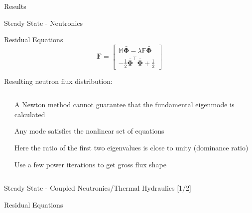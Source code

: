 \documentclass{beamer}
\begin{document}
\begin{section}{Results}
\begin{frame}{Steady State - Neutronics}
\begin{customlist}{2ex}{0pt}
  \item Residual Equations
  \[
    \mathbf{F}=\left[\begin{array}{c}
    \mathbb{M}\bar{\mathbf{\Phi}}-\lambda\mathbb{F}\bar{\mathbf{\Phi}}\\
    -\frac{1}{2}\bar{\mathbf{\Phi}}^{\top}\bar{\mathbf{\Phi}}+\frac{1}{2}
    \end{array}\right]
  \]
  \item Resulting neutron flux distribution:
\end{customlist}
  \begin{center}
  \begin{columns}
    \begin{column}{0.5\textwidth}
      \begin{animateinline}[poster = first, controls]{2}
	\scalebox{0.5}{}
	\newframe \scalebox{0.5}{}
      \end{animateinline}
    \end{column}
    \begin{column}{0.5\textwidth}
      \begin{customlist}{2ex}{0pt}
	\item A Newton method cannot guarantee that the fundamental eigenmode is calculated
	\item Any mode satisfies the nonlinear set of equations
	\item Here the ratio of the first two eigenvalues is close to unity (dominance ratio)
	\item Use a few power iterations to get gross flux shape
      \end{customlist}
    \end{column}
  \end{columns}
  \end{center}
\end{frame}
\begin{frame}{Steady State - Coupled Neutronics/Thermal Hydraulics [1/2]}
  \begin{block}{Residual Equations}
    \begin{center}
    \begin{columns}

\end{columns}
\end{center}
\end{block}
\end{frame}
\end{section}
\end{document}

